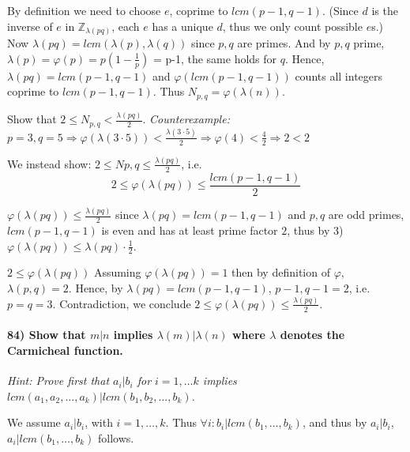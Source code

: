 \documentclass[
]{article}
\begin{document}
By definition we need to choose \(e\), coprime to \(lcm(p-1,q-1)\).
(Since \(d\) is the inverse of \(e\) in \(\mathbb{Z}_{\lambda(pq)}\),
each \(e\) has a unique \(d\), thus we only count possible \(e\)s.) Now
\(\lambda (pq) = lcm(\lambda(p), \lambda(q))\) since \(p,q\) are primes.
And by \(p,q\) prime, \(\lambda(p) = \varphi(p) = p(1- \frac{1}{p})\) =
p-1, the same holds for \(q\). Hence, \(\lambda(pq) = lcm(p-1,q-1)\) and
\(\varphi(lcm(p-1,q-1))\) counts all integers coprime to
\(lcm(p-1, q-1)\). Thus \(N_{p,q} = \varphi(\lambda(n))\).

Show that \(2 \leq N_{p,q} < \frac{\lambda(pq)}{2}\).
\emph{Counterexample:
\(p=3, q=5 \Rightarrow \varphi(\lambda (3 \cdot 5)) < \frac{\lambda(3 \cdot 5)}{2} \Rightarrow \varphi(4) < \frac{4}{2} \Rightarrow 2 < 2\)}

We instead show: \(2 \leq N{p,q} \leq \frac{\lambda(pq)}{2}\), i.e. \[
2 \leq \varphi(\lambda(pq)) \leq \frac{lcm(p-1,q-1)}{2}
\]

\(\varphi(\lambda(pq)) \leq \frac{\lambda(pq)}{2}\) since
\(\lambda(pq) = lcm(p-1, q-1)\) and \(p,q\) are odd primes,
\(lcm(p-1, q-1)\) is even and has at least prime factor \(2\), thus by
3) \(\varphi(\lambda(pq)) \leq \lambda(pq) \cdot \frac{1}{2}\).

\(2 \leq \varphi(\lambda(pq))\) Assuming \(\varphi(\lambda(pq)) = 1\)
then by definition of \(\varphi\), \(\lambda(p,q) = 2\). Hence, by
\(\lambda(pq) = lcm(p-1, q-1)\), \(p-1, q-1 = 2\), i.e.~\(p = q = 3\).
Contradiction, we conclude
\(2 \leq \varphi(\lambda(pq)) \leq \frac{\lambda(pq)}{2}\).

\hypertarget{show-that-mn-implies-lambdam-lambda-n-where-lambda-denotes-the-carmicheal-function.}{%
\paragraph{\texorpdfstring{84) Show that \(m|n\) implies
\(\lambda(m) | \lambda (n)\) where \(\lambda\) denotes the Carmicheal
function.}{84) Show that m\textbar n implies \textbackslash lambda(m) \textbar{} \textbackslash lambda (n) where \textbackslash lambda denotes the Carmicheal function.}}\label{show-that-mn-implies-lambdam-lambda-n-where-lambda-denotes-the-carmicheal-function.}}

\emph{Hint: Prove first that \(a_i | b_i\) for \(i = 1, \dots k\)
implies \(lcm(a_1,a_2,\dots , a_k) | lcm(b_1,b_2, \dots, b_k)\).}

We assume \(a_i | b_i\), with \(i = 1, \dots, k\). Thus
\(\forall i: b_i | lcm(b_1, \dots, b_k)\), and thus by \(a_i|b_i\),
\(a_i|lcm(b_1, \dots, b_k)\) follows.
\end{document}
